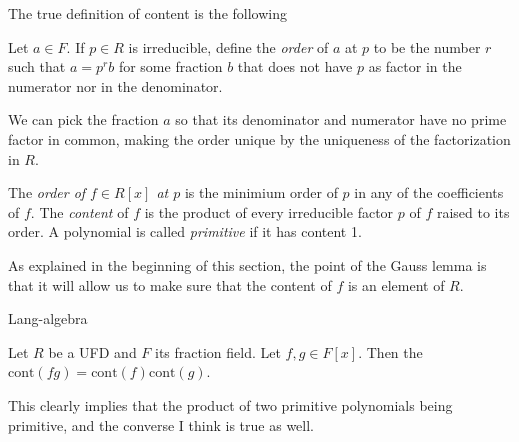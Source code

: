 \medskip\noindent
The true definition of content is the following

\begin{definition}
\label{definition-order-of-fraction}
Let $a \in F$. If $p \in R$ is irreducible, define the {\it order} of $a$ at $p$
to be the number $r$ such that $a=p^rb$ for some fraction $b$ that does not have
$p$ as factor in the numerator nor in the denominator.
\end{definition}

We can pick the fraction $a$ so that its denominator and numerator have no prime
factor in common, making the order unique by the uniqueness of the factorization
in $R$.

\begin{definition}
\label{definition-content}
\begin{reference}
\cite[p. 181]{Lang-algebra}
\end{reference}
The {\it  order of $f\in R[x]$ at $p$} is the minimium order of
$p$ in any of the coefficients of $f$. The {\it content} of $f$ is the product
of every irreducible factor $p$ of $f$ raised to its order. A polynomial is
called {\it primitive} if it has content 1.
\end{definition}

As explained in the beginning of this section, the point of the Gauss
lemma is that it will allow us to make sure that the content of $f$ is an
element of $R$.

\begin{lemma}
\label{lemma-true-Gauss}
\begin{reference}
\cite{Chapter 4, Theorem 2.1}{Lang-algebra}
\end{reference}
Let $R$ be a UFD and $F$ its fraction field. Let $f,g\in F[x]$. Then the
$\text{cont}(fg)=\text{cont}(f)\text{cont}(g)$.
\end{lemma}

This clearly implies that the product of two primitive polynomials being
primitive, and the converse I think is true as well.

